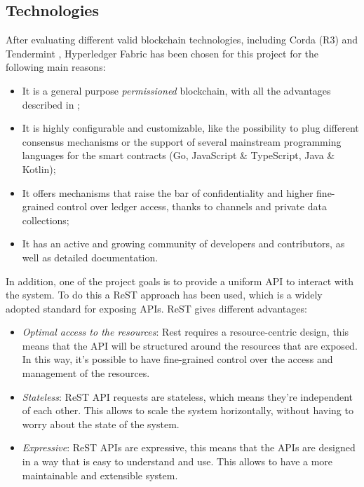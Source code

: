 \documentclass{scrartcl}
\begin{document}
\fi

\subsection{Technologies}
\label{sec:technologies}

\iffalse

After evaluating different valid blockchain technologies, including Corda (R3) \cite{corda} and Tendermint \cite{tendermint}, Hyperledger Fabric has been chosen for this project for the following main reasons:

\begin{itemize}
    \item It is a general purpose \textit{permissioned} blockchain, with all the advantages described in ;
    \item It is highly configurable and customizable, like the possibility to plug different consensus mechanisms or the support of several mainstream programming languages for the smart contracts (Go, JavaScript \& TypeScript, Java \& Kotlin);
    \item It offers mechanisms that raise the bar of confidentiality and higher fine-grained control over ledger access, thanks to channels and private data collections;
    \item It has an active and growing community of developers and contributors, as well as detailed documentation.
\end{itemize}

In addition, one of the project goals is to provide a uniform API to interact with the system. 
%
To do this a ReST approach has been used, which is a widely adopted standard for exposing APIs. 
%
ReST gives different advantages:

\begin{itemize}
    \item \emph{Optimal access to the resources}: Rest requires a resource-centric design, this means that the API will be structured around the resources that are exposed. In this way, it's possible to have fine-grained control over the access and management of the resources.
    \item \emph{Stateless}: ReST API requests are stateless, which means they're independent of each other. This allows to scale the system horizontally, without having to worry about the state of the system.
    \item \emph{Expressive}: ReST APIs are expressive, this means that the APIs are designed in a way that is easy to understand and use. This allows to have a more maintainable and extensible system.
\end{itemize}
\end{document}

